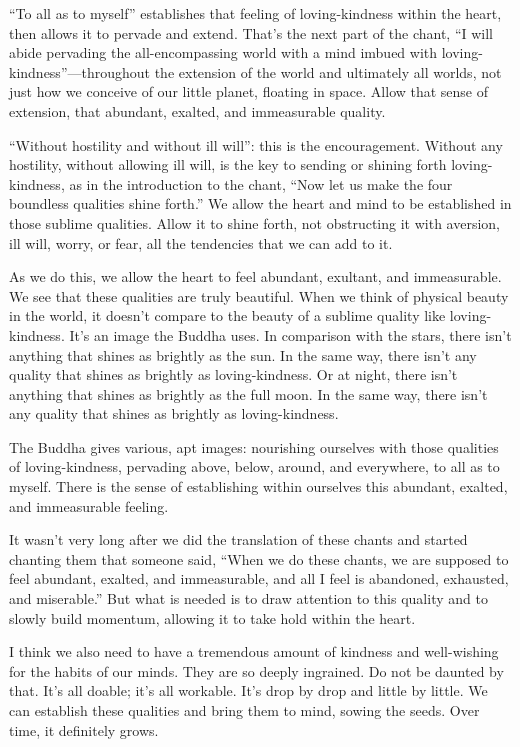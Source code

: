 “To all as to myself” establishes that feeling of loving-kindness within
the heart, then allows it to pervade and extend. That’s the next part of
the chant, “I will abide pervading the all-encompassing world with a
mind imbued with loving-kindness”—throughout the extension of the world
and ultimately all worlds, not just how we conceive of our little
planet, floating in space. Allow that sense of extension, that abundant,
exalted, and immeasurable quality.

“Without hostility and without ill will”: this is the encouragement.
Without any hostility, without allowing ill will, is the key to sending
or shining forth loving-kindness, as in the introduction to the chant,
“Now let us make the four boundless qualities shine forth.” We allow the
heart and mind to be established in those sublime qualities. Allow it to
shine forth, not obstructing it with aversion, ill will, worry, or fear,
all the tendencies that we can add to it.

As we do this, we allow the heart to feel abundant, exultant, and
immeasurable. We see that these qualities are truly beautiful. When we
think of physical beauty in the world, it doesn’t compare to the beauty
of a sublime quality like loving-kindness. It’s an image the Buddha
uses. In comparison with the stars, there isn’t anything that shines as
brightly as the sun. In the same way, there isn’t any quality that
shines as brightly as loving-kindness. Or at night, there isn’t anything
that shines as brightly as the full moon. In the same way, there isn’t
any quality that shines as brightly as loving-kindness.

The Buddha gives various, apt images: nourishing ourselves with those
qualities of loving-kindness, pervading above, below, around, and
everywhere, to all as to myself. There is the sense of establishing
within ourselves this abundant, exalted, and immeasurable feeling.

It wasn’t very long after we did the translation of these chants and
started chanting them that someone said, “When we do these chants, we
are supposed to feel abundant, exalted, and immeasurable, and all I feel
is abandoned, exhausted, and miserable.” But what is needed is to draw
attention to this quality and to slowly build momentum, allowing it to
take hold within the heart.

I think we also need to have a tremendous amount of kindness and
well-wishing for the habits of our minds. They are so deeply ingrained.
Do not be daunted by that. It’s all doable; it’s all workable. It’s drop
by drop and little by little. We can establish these qualities and bring
them to mind, sowing the seeds. Over time, it definitely grows.

